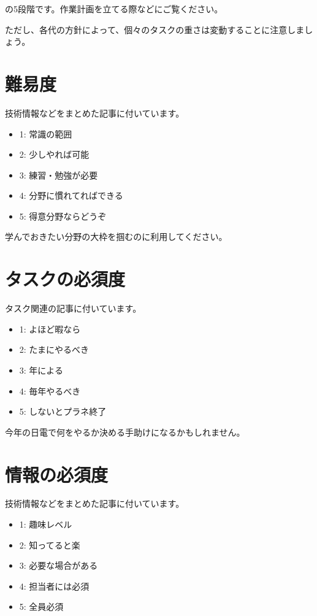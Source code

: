 \documentclass[letterpaper,10pt,dvipdfmx]{sphinxmanual}
\begin{document}
の5段階です。作業計画を立てる際などにご覧ください。

ただし、各代の方針によって、個々のタスクの重さは変動することに注意しましょう。


\section{難易度}
\label{\detokenize{main:id5}}
技術情報などをまとめた記事に付いています。
\begin{itemize}
\item {} 
1: 常識の範囲

\item {} 
2: 少しやれば可能

\item {} 
3: 練習・勉強が必要

\item {} 
4: 分野に慣れてればできる

\item {} 
5: 得意分野ならどうぞ

\end{itemize}

学んでおきたい分野の大枠を掴むのに利用してください。


\section{タスクの必須度}
\label{\detokenize{main:id6}}
タスク関連の記事に付いています。
\begin{itemize}
\item {} 
1: よほど暇なら

\item {} 
2: たまにやるべき

\item {} 
3: 年による

\item {} 
4: 毎年やるべき

\item {} 
5: しないとプラネ終了

\end{itemize}

今年の日電で何をやるか決める手助けになるかもしれません。


\section{情報の必須度}
\label{\detokenize{main:id7}}
技術情報などをまとめた記事に付いています。
\begin{itemize}
\item {} 
1: 趣味レベル

\item {} 
2: 知ってると楽

\item {} 
3: 必要な場合がある

\item {} 
4: 担当者には必須

\item {} 
5: 全員必須

\end{itemize}
\end{document}
